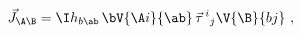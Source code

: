\begin{equation} \label{J}
  \vec{J}_{\A\B} = \I h_{b\ab}\, \bV{\A i}{\ab}\, \vec{\tau}\,{}^i{}_j
  \V{\B}{bj}\ ,
 \end{equation}

